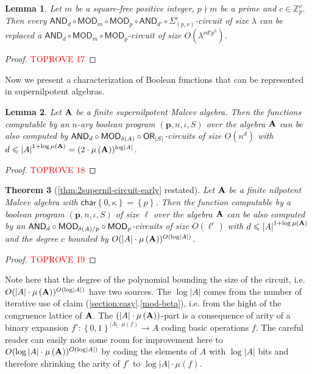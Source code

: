 \documentclass[11pt,a4paper]{amsart}
\newtheorem{lm}{Lemma}[section]
\newtheorem{thm}[lm]{Theorem}
\newcommand{\m}[1]{{\uppercase {\bf{#1}}}}
\newcommand{\set}[1]{{\left\{ {#1} \right\} }}
\newcommand{\card}[1]{\left| #1 \right|}
\renewcommand{\leq}{\leqslant}
\newcommand{\po}[1]{{\mathbf {#1}}}
\newcounter{note}
\newcounter{claim}
\newcommand{\map}{\longrightarrow}
\newcommand{\charr}{\mathsf{char}}
\newcommand{\charrset}[1]{\charr\set{#1}}
\newcommand{\z}{\mathbb{Z}}
\newcommand{\progg}[4]{\left(#1,#2,#3,#4\right)}
\newcommand{\fcirc}[1]{#1^\circ}
\newcommand{\true}{1}
\newcommand{\false}{0}
\newcommand{\bool}{\set{\false,\true}}
\newcommand{\sumpk}[2]{\Sigma_{(#1,#2)}}
\newcommand{\ccc}{c}    \newcommand{\s}{s}
\newcommand{\ccand}{\mathsf{AND}}
\newcommand{\ccmod}{\mathsf{MOD}}
\newcommand{\ccor}{\mathsf{OR}}
\newcommand{\pdiv}[1]{\ppdiv\left(#1\right)}    \newcommand{\ar}[1]{\mu\left({#1}\right)}       \newcommand{\maxar}[1]{\mu\left({\m #1}\right)}
\begin{document}
\begin{lm}\label{lm:5to3}
Let $m$ be a square-free positive integer, $p\nmid m$ be a prime and $\ccc\in\z_p^\nu$.
Then every $\ccand_d\circ\ccmod_m\circ\ccmod_p
\circ\ccand_{d'}\circ\sumpk{p}{\nu}^{\ccc}$-circuit of size $\lambda$
can be replaced a
$\ccand_d\circ\ccmod_m\circ\ccmod_p$-circuit
of size $O(\lambda^{\nu d'p^3})$.
\end{lm}
\begin{proof}\textcolor{red}{TOPROVE 17}\end{proof}







Now we present a characterization of Boolean functions that can be represented in supernilpotent algebras. 


\begin{lm}
\label{lm:supernil-circuit}
Let $\m A$ be a finite supernilpotent Malcev algebra.
Then the functions computable by an $n$-ary boolean program
$\progg{\po p}{n}{\iota}{S}$ over the algebra $\m A$
can be also computed by
$\ccand_d\circ\ccmod_{\pdiv A}\circ\ccor_{\card S}$-circuits of size $O(n^d)$ with
$d\leq\card{A}^{1+\log\maxar A} = (2 \cdot \maxar A)^{\log\card{A}}$.
\end{lm}



\begin{proof}\textcolor{red}{TOPROVE 18}\end{proof}

\begin{thm}[\cref{thm:2supernil-circuit-early} restated]
\label{thm:2supernil-circuit}
Let $\m A$ be a finite nilpotent Malcev algebra with $\charrset{0,\kappa}=\set{p}$.
Then the function computable by a boolean program
$\progg{\po p}{n}{\iota}{S}$ of size $\ell$ over the algebra $\m A$
can be also computed by an
$\ccand_d\circ\ccmod_{\pdiv A/p}\circ\ccmod_p$-circuits of size $O(\ell^c)$
with $d\leq\card{A}^{1+\log\maxar A}$
and the degree $c$  bounded by $O(\card{A}\cdot\maxar{A})^{O(\log\card{A})}$.
\end{thm}



\begin{proof}\textcolor{red}{TOPROVE 19}\end{proof}


Note here that the degree of the polynomial bounding the size of the circuit,
i.e.  $O(\card{A}\cdot\maxar{A})^{O(\log\card{A})}$ have two sources.
The $\log\card{A}$ comes from the number of iterative use of claim (\ref{section:easy}.\ref{mod-beta}), i.e. from the hight of the congruence lattice of $\m A$.
The $(\card{A}\cdot\maxar{A})$-part is a consequence of arity of a binary expansion
$\fcirc{f} : \bool^{\card{A}\cdot\ar{f}} \map A$ coding basic operations $f$.
The careful reader can easily note some room for improvement here to
$O(\log\card{A}\cdot\maxar{A})^{O(\log\card{A})}$ by coding the elements of $A$ with $\log\card{A}$ bits and therefore shrinking the arity of $\fcirc{f}$ to $\log\card{A}\cdot\ar{f}$.
\end{document}
